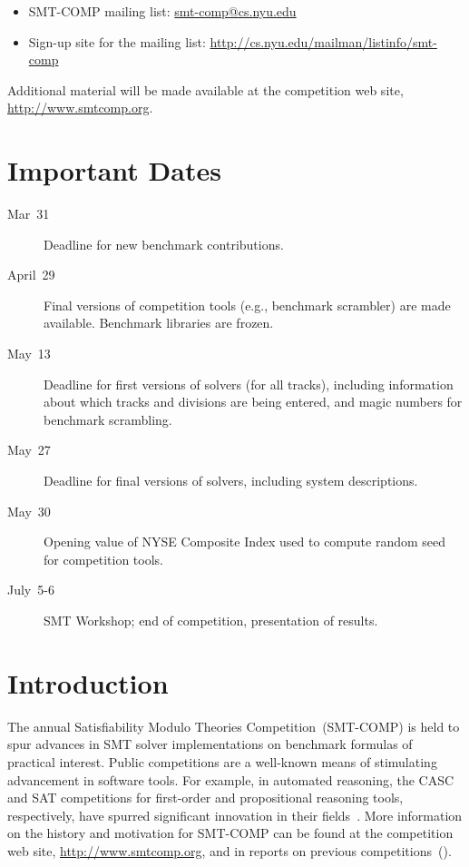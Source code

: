 \documentclass[12pt]{article}
\begin{document}
\begin{itemize}
\item SMT-COMP mailing list:
  \href{mailto:smt-comp@cs.nyu.edu}{\textrm{smt-comp@cs.nyu.edu}}
\item Sign-up site for the mailing list:
  \url{http://cs.nyu.edu/mailman/listinfo/smt-comp}
\end{itemize}

\noindent Additional material will be made available at the
competition web site, \url{http://www.smtcomp.org}.


\newpage

\section{Important Dates}
\label{sec:important}

\begin{description}
\item[Mar~31] Deadline for new benchmark contributions.
\item[April~29] Final versions of competition tools (e.g., benchmark
  scrambler) are made available.  Benchmark libraries are frozen.
\item[May~13] Deadline for first versions of solvers (for all tracks),
  including information about which tracks and divisions are being
  entered, and magic numbers for benchmark scrambling.
\item[May~27] Deadline for final versions of solvers, including
  system descriptions.
\item[May~30] Opening value of NYSE Composite Index used to compute
  random seed for competition tools.
\item[July~5-6] SMT Workshop; end of competition, presentation of
  results.
\end{description}


\section{Introduction}

The annual Satisfiability Modulo Theories Competition~(SMT-COMP) is
held to spur advances in SMT solver implementations on benchmark
formulas of practical interest.  Public competitions are a well-known
means of stimulating advancement in software tools.  For example, in
automated reasoning, the CASC and SAT competitions for first-order and
propositional reasoning tools, respectively, have spurred significant
innovation in their fields~\cite{leberre+03,PSS02}.  More information
on the history and motivation for SMT-COMP can be found at the
competition web site, \url{http://www.smtcomp.org}, and in reports on
previous
competitions~(\cite{SMTCOMP-JAR,SMTCOMP-FMSD,BDOS08,SMTCOMP-2008,CDW14,SMTCOMP-2012,CSW15}).
\end{document}
